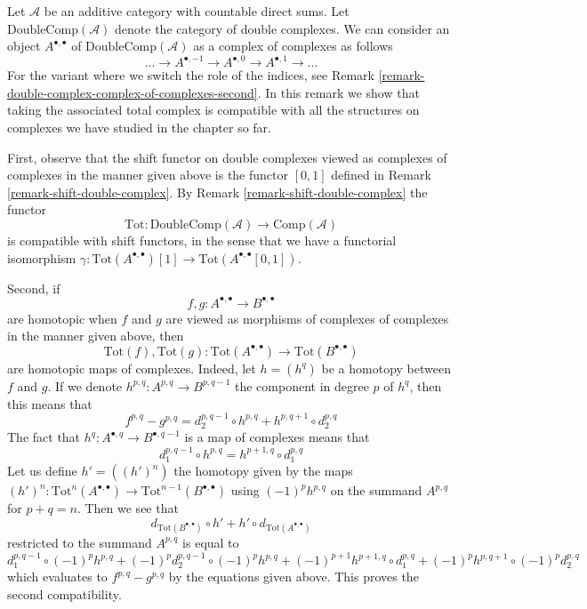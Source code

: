 \begin{remark}
\label{remark-double-complex-complex-of-complexes-first}
Let $\mathcal{A}$ be an additive category with countable direct sums.
Let $\text{DoubleComp}(\mathcal{A})$ denote the category of double complexes.
We can consider an object $A^{\bullet, \bullet}$ of
$\text{DoubleComp}(\mathcal{A})$ as a complex of complexes
as follows
$$
\ldots \to A^{\bullet, -1} \to A^{\bullet, 0} \to A^{\bullet, 1} \to \ldots
$$
For the variant where we switch the role of the indices, see
Remark \ref{remark-double-complex-complex-of-complexes-second}.
In this remark we show that taking the associated total complex
is compatible with all the structures on complexes we have studied
in the chapter so far.

\medskip\noindent
First, observe that the shift functor on double complexes viewed
as complexes of complexes in the manner given above is the functor
$[0, 1]$ defined in Remark \ref{remark-shift-double-complex}.
By Remark \ref{remark-shift-double-complex} the functor
$$
\text{Tot} : \text{DoubleComp}(\mathcal{A}) \to \text{Comp}(\mathcal{A})
$$
is compatible with shift functors, in the sense that we have a functorial
isomorphism $\gamma : \text{Tot}(A^{\bullet, \bullet})[1] \to
\text{Tot}(A^{\bullet, \bullet}[0, 1])$.

\medskip\noindent
Second, if
$$
f, g : A^{\bullet, \bullet} \to B^{\bullet, \bullet}
$$
are homotopic when $f$ and $g$ are viewed as morphisms of complexes
of complexes in the manner given above, then
$$
\text{Tot}(f), \text{Tot}(g) :
\text{Tot}(A^{\bullet, \bullet}) \to \text{Tot}(B^{\bullet, \bullet})
$$
are homotopic maps of complexes. Indeed, let $h = (h^q)$
be a homotopy between $f$ and $g$. If we denote
$h^{p, q} : A^{p, q} \to B^{p, q - 1}$ the component in degree $p$ of $h^q$,
then this means that
$$
f^{p, q} - g^{p, q} = d_2^{p, q - 1} \circ h^{p, q} +
h^{p, q + 1} \circ d_2^{p, q}
$$
The fact that $h^q : A^{\bullet, q} \to B^{\bullet, q - 1}$ is a map of
complexes means that
$$
d_1^{p, q - 1} \circ h^{p, q} = h^{p + 1, q} \circ d_1^{p, q}
$$
Let us define $h' = ((h')^n)$ the homotopy given by the maps
$(h')^n : \text{Tot}^n(A^{\bullet, \bullet}) \to
\text{Tot}^{n - 1}(B^{\bullet, \bullet})$
using $(-1)^ph^{p, q}$ on the summand $A^{p, q}$ for $p + q = n$.
Then we see that
$$
d_{\text{Tot}(B^{\bullet, \bullet})} \circ h' +
h' \circ d_{\text{Tot}(A^{\bullet, \bullet})}
$$
restricted to the summand $A^{p, q}$ is equal to
$$
d_1^{p, q - 1} \circ (-1)^p h^{p, q} +
(-1)^p d_2^{p, q - 1} \circ (-1)^p h^{p, q} +
(-1)^{p + 1} h^{p + 1, q} \circ d_1^{p, q} +
(-1)^p h^{p, q + 1} \circ (-1)^p d_2^{p, q}
$$
which evaluates to $f^{p, q} - g^{p, q}$ by the equations given above.
This proves the second compatibility.


\end{remark}
